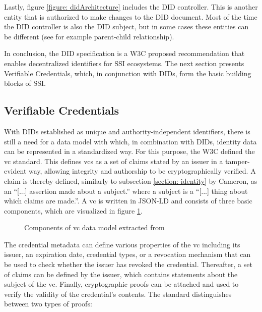         Lastly, figure \ref{figure: didArchitecture} includes the \ac{DID} controller. This is another entity that is authorized to make changes to the \ac{DID} document. Most of the time the \ac{DID} controller is also the \ac{DID} subject, but in some cases these entities can be different (see for example parent-child relationship). \cite{sporny_decentralized_2021}
        
        In conclusion, the \ac{DID} specification is a W3C proposed recommendation that enables decentralized identifiers for \ac{SSI} ecosystems. The next section presents Verifiable Credentials, which, in conjunction with \acp{DID}, form the basic building blocks of \ac{SSI}.
	    
	    \subsection{Verifiable Credentials}\label{subsection: vc}
	    
	    With \acp{DID} established as unique and authority-independent identifiers, there is still a need for a data model with which, in combination with \acp{DID}, identity data can be represented in a standardized way. For this purpose, the W3C defined the \acf{vc} standard. This defines \acp{vc} as a set of claims stated by an issuer in a tamper-evident way, allowing integrity and authorship to be cryptographically verified. A claim is thereby defined, similarly to subsection \ref{section: identity} by Cameron, as an “[...] assertion made about a subject.” where a subject is a “[...] thing about which claims are made.”. A \ac{vc} is written in JSON-LD and consists of three basic components, which are visualized in figure \ref{figure: vc components}. \cite{sporny_verifiable_2019}
	    
	    \begin{figure}[ht]
    	    \centering
    	    \makebox[\textwidth]{}
            \caption[Components of VC data model]{Components of \ac{vc} data model extracted from \cite{sporny_verifiable_2019}}
            \label{figure: vc components}
        \end{figure}
        
        The credential metadata can define various properties of the \ac{vc} including its issuer, an expiration date, credential types, or a revocation mechanism that can be used to check whether the issuer has revoked the credential. Thereafter, a set of claims can be defined by the issuer, which contains statements about the subject of the \ac{vc}. Finally, cryptographic proofs can be attached and used to verify the validity of the credential's contents. The standard distinguishes between two types of proofs: \cite{sporny_verifiable_2019}
        
